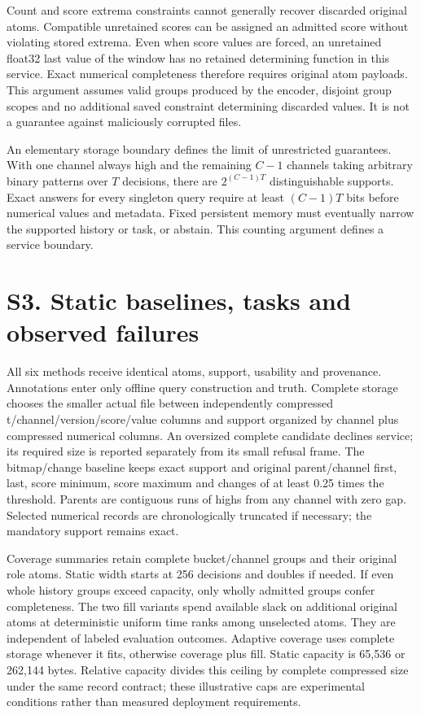 \documentclass[11pt]{article}
\begin{document}
Count and score extrema constraints cannot generally recover discarded original atoms. Compatible unretained scores can be assigned an admitted score without violating stored extrema. Even when score values are forced, an unretained float32 last value of the window has no retained determining function in this service. Exact numerical completeness therefore requires original atom payloads. This argument assumes valid groups produced by the encoder, disjoint group scopes and no additional saved constraint determining discarded values. It is not a guarantee against maliciously corrupted files.

An elementary storage boundary defines the limit of unrestricted guarantees. With one channel always high and the remaining $C-1$ channels taking arbitrary binary patterns over $T$ decisions, there are $2^{(C-1)T}$ distinguishable supports. Exact answers for every singleton query require at least $(C-1)T$ bits before numerical values and metadata. Fixed persistent memory must eventually narrow the supported history or task, or abstain. This counting argument defines a service boundary.

\section*{S3. Static baselines, tasks and observed failures}
All six methods receive identical atoms, support, usability and provenance. Annotations enter only offline query construction and truth. Complete storage chooses the smaller actual file between independently compressed t/channel/version/score/value columns and support organized by channel plus compressed numerical columns. An oversized complete candidate declines service; its required size is reported separately from its small refusal frame. The bitmap/change baseline keeps exact support and original parent/channel first, last, score minimum, score maximum and changes of at least 0.25 times the threshold. Parents are contiguous runs of highs from any channel with zero gap. Selected numerical records are chronologically truncated if necessary; the mandatory support remains exact.

Coverage summaries retain complete bucket/channel groups and their original role atoms. Static width starts at 256 decisions and doubles if needed. If even whole history groups exceed capacity, only wholly admitted groups confer completeness. The two fill variants spend available slack on additional original atoms at deterministic uniform time ranks among unselected atoms. They are independent of labeled evaluation outcomes. Adaptive coverage uses complete storage whenever it fits, otherwise coverage plus fill. Static capacity is 65,536 or 262,144 bytes. Relative capacity divides this ceiling by complete compressed size under the same record contract; these illustrative caps are experimental conditions rather than measured deployment requirements.
\end{document}
